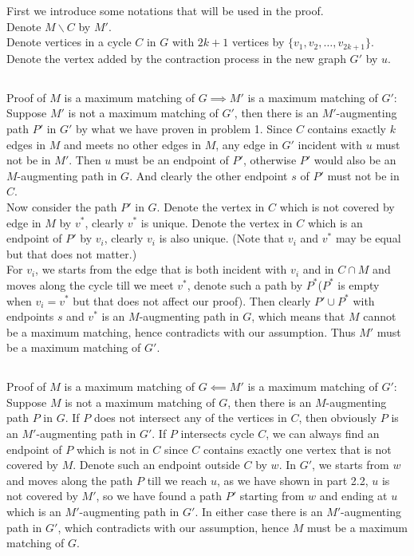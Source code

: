 \documentclass[12pt,letterpaper]{article}
\begin{document}
\newpage
\section{}
First we introduce some notations that will be used in the proof.\\
Denote $M\backslash C$ by $M'$.\\
Denote vertices in a cycle $C$ in $G$ with $2k+1$ vertices by $\{v_1,v_2,\dots,v_{2k+1}\}$.\\
Denote the vertex added by the contraction process in the new graph $G'$ by $u$.
\subsection{}
Proof of $M$ is a maximum matching of $G \implies M'$ is a maximum matching of $G'$:\\
Suppose $M'$ is not a maximum matching of $G'$,
then there is an $M'$-augmenting path $P'$ in $G'$
by what we have proven in problem 1.
Since $C$ contains exactly $k$ edges in $M$ and meets no other edges in $M$,
any edge in $G'$ incident with $u$ must not be in $M'$.
Then $u$ must be an endpoint of $P'$,
otherwise $P'$ would also be an $M$-augmenting path in $G$.
And clearly the other endpoint $s$ of $P'$ must not be in $C$.\\
Now consider the path $P'$ in $G$. 
Denote the vertex in $C$ which is not covered by edge in $M$ by $v^*$,
clearly $v^*$ is unique.
Denote the vertex in $C$ which is an endpoint of $P'$ by $v_i$,
clearly $v_i$ is also unique. 
(Note that $v_i$ and $v^*$ may be equal but that does not matter.)\\
For $v_i$, we starts from the edge that is both incident with $v_i$ 
and in $C\cap M$ and moves along the cycle till we meet $v^*$,
denote such a path by $P^*$($P^*$ is empty when $v_i=v^*$ but that does not affect our proof).
Then clearly $P'\cup P^*$ with endpoints $s$ and $v^*$ is an $M$-augmenting path in $G$,
which means that $M$ cannot be a maximum matching, 
hence contradicts with our assumption.
Thus $M'$ must be a maximum matching of $G'$.

\subsection{}
Proof of $M$ is a maximum matching of $G \impliedby M'$ is a maximum matching of $G'$:\\
Suppose $M$ is not a maximum matching of $G$,
then there is an $M$-augmenting path $P$ in $G$.
If $P$ does not intersect any of the vertices in $C$,
then obviously $P$ is an $M'$-augmenting path in $G'$.
If $P$ intersects cycle $C$,
we can always find an endpoint of $P$ which is not in $C$
since $C$ contains exactly one vertex that is not covered by $M$.
Denote such an endpoint outside $C$ by $w$.
In $G'$, we starts from $w$ and moves along the path $P$ 
till we reach $u$,
as we have shown in part 2.2,
$u$ is not covered by $M'$,
so we have found a path $P'$ starting from $w$ and ending at $u$ 
which is an $M'$-augmenting path in $G'$.
In either case there is an $M'$-augmenting path in $G'$,
which contradicts with our assumption,
hence $M$ must be a maximum matching of $G$.
\end{document}
